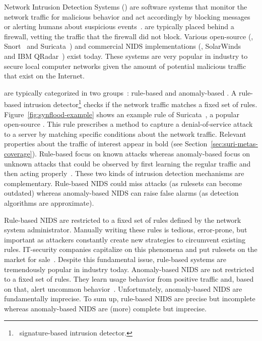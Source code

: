 \documentclass[runningheads]{llncs}
\begin{document}
Network Intrusion Detection Systems (\nids{}) are software systems
that monitor the network traffic for malicious behavior and act
accordingly by blocking messages or alerting humans about suspicious
events~\cite{Mitchell:2014:SID:2597757.2542049}. \nids{} are typically
placed behind a firewall, vetting the traffic that the firewall did
not block. Various open-source (\eg{}, Snort~\cite{snort} and
Suricata~\cite{suricata}) and commercial NIDS implementations (\eg{},
SolarWinds~\cite{solarwinds} and IBM QRadar~\cite{qradar}) exist
today. These systems are very popular in industry to secure local
computer networks given the amount of potential malicious traffic that
exist on the Internet.

\sloppy \nids{} are typically categorized in two
groups~\cite{kumar2007survey}: rule-based and anomaly-based \nids. A
rule-based intrusion detector\footnote{\aka\ signature-based intrusion
  detector.} checks if the network traffic matches a fixed set of
rules. Figure~\ref{fig:synflood-example} shows an example rule of
Suricata~\cite{suricata}, a popular open-source \nids{}. This rule
prescribes a method to capture a denial-of-service
attack~\cite{understanding-dos} to a server by matching specific
conditions about the network traffic. Relevant properties about the
traffic of interest appear in bold (see
Section~\ref{sec:suri-metas-coverage}). Rule-based \nids{} focus on
known attacks whereas anomaly-based \nids{} focus on unknown attacks
that could be observed by first learning the regular traffic and then
acting
properly~\cite{kumar2007survey,Mitchell:2014:SID:2597757.2542049,cordy-etal-issta19}. These
two kinds of intrusion detection mechanisms are
complementary. Rule-based NIDS could miss attacks (as rulesets can
become outdated) whereas anomaly-based NIDS can raise false alarms (as
detection algorithms are approximate).

Rule-based NIDS are restricted to a fixed set of rules defined by the
network system administrator. Manually writing these rules is tedious,
error-prone, but important as attackers constantly create new
strategies to circumvent existing rules. IT-security companies
capitalize on this phenomena and put rulesets on the market for
sale~\cite{proofpoint-etpro,snort-rule-subscriptions}.  Despite this
fundamental issue, rule-based systems are tremendously popular in
industry today. Anomaly-based NIDS are not restricted to a fixed set
of rules. They learn usage behavior from positive traffic and, based
on that, alert uncommon behavior~\cite{7579764}. Unfortunately,
anomaly-based NIDS are fundamentally imprecise. To sum up, rule-based
NIDS are precise but incomplete whereas anomaly-based NIDS are (more)
complete but imprecise.
\end{document}
